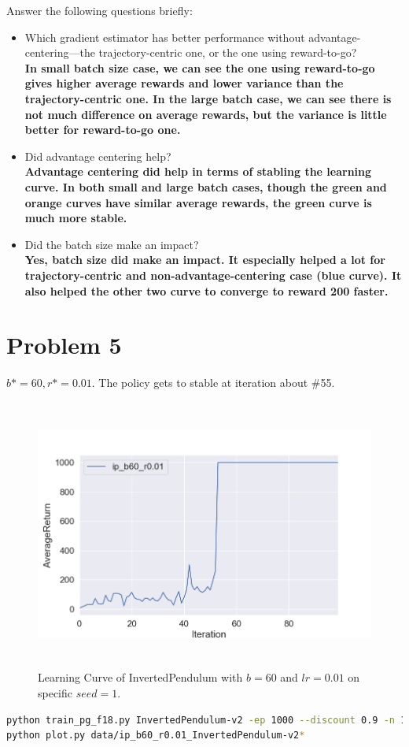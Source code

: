 \documentclass[12pt]{article}
\begin{document}
Answer the following questions briefly: 
  \begin{itemize}
  \item Which gradient estimator has better performance without advantage-centering---the trajectory-centric one, or the one using reward-to-go? \\
  \textbf{In small batch size case, we can see the one using reward-to-go gives higher average rewards and lower variance than the trajectory-centric one. In the large batch case, we can see there is not much difference on average rewards, but the variance is little better for reward-to-go one.}

  \item Did advantage centering help? \\
  \textbf{Advantage centering did help in terms of stabling the learning curve. In both small and large batch cases, though the green and orange curves have similar average rewards, the green curve is much more stable.}
  
  \item Did the batch size make an impact? \\
  \textbf{Yes, batch size did make an impact. It especially helped a lot for trajectory-centric and non-advantage-centering case (blue curve). It also helped the other two curve to converge to reward 200 faster.}
  \end{itemize}


\newpage
\section*{Problem 5}
$b* = 60, r* = 0.01$. The policy gets to stable at iteration about \#55.
\begin{figure}[H]
  \centering
  \includegraphics[height=3.5in]{p5.png}
  \caption{Learning Curve of InvertedPendulum with $b = 60$ and $lr = 0.01$ on specific $seed = 1$.}
\end{figure}
\begin{lstlisting}[language=bash]
python train_pg_f18.py InvertedPendulum-v2 -ep 1000 --discount 0.9 -n 100 -e 1 -l 2 -s 64 -b 60 -lr 0.01 -rtg --exp_name ip_b60_r0.01
python plot.py data/ip_b60_r0.01_InvertedPendulum-v2*
\end{lstlisting}
\end{document}
